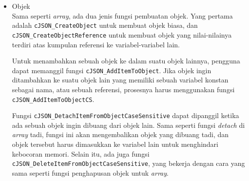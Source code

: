 \begin{itemize}[listparindent=\parindent]
	Jika ada sebuah objek yang ingin dihapus dari \textit{array} tertentu, perangkat lunak dapat memanggil fungsi \verb|cJSON_DetachItemFromArray|. Fungsi ini akan mengembalikan objek yang dihapus dari \textit{array} tadi, jadi objek ini harus diberikan ke sebuah penunjuk lainnya (dimasukkan ke dalam variabel lain) agar tidak terjadi kebocoran memori. Selain fungsi tersebut, fungsi \verb|cJSON_DeleteItemFromArray| juga dapat digunakan\textemdash bedanya adalah objek yang dihapus dari \textit{array} tadi, jika dihapus menggunakan fungsi ini, akan langsung dihapus, seakan-akan fungsi \verb|cJSON_Delete| dipanggil untuk objek tersebut.
	
	Untuk menimpa/mengganti nilai suatu objek di dalam \textit{array}, fungsi \verb|cJSON_ReplaceItemIn|\linebreak \verb|Array| dapat dipanggil dengan indeks dari objek yang ingin diganti sebagai parameternya. Selain fungsi tersebut, fungsi \verb|cJSON_ReplaceItemViaPointer| juga dapat digunakan\textemdash fungsi ini bekerja dengan memutuskan (\textit{detach}) objek lama yang ingin diganti, menghapus objek tersebut, dan menyisipkan objek yang baru ke tempat objek lama yang sudah dihapus tadi.
	
	Terakhir, untuk mendapatkan objek tertentu dalam \textit{array} berdasarkan indeksnya, \mbox{perangkat} lunak dapat memanggil fungsi \verb|cJSON_GetArrayItem|. Ukuran dari \textit{array}-nya sendiri juga dapat dilihat dengan fungsi \verb|cJSON_GetArraySize|.
	
	\item Objek\\	
	Sama seperti \textit{array}, ada dua jenis fungsi pembuatan objek. Yang pertama adalah \verb|cJSON_Create|\linebreak \verb|Object| untuk membuat objek biasa, dan \verb|cJSON_CreateObjectReference| untuk membuat objek yang nilai-nilainya terdiri atas kumpulan referensi ke variabel-variabel lain.
	
	Untuk menambahkan sebuah objek ke dalam suatu objek lainnya, pengguna dapat \mbox{memanggil} fungsi \verb|cJSON_AddItemToObject|. Jika objek ingin ditambahkan ke suatu \mbox{objek} lain yang memiliki sebuah variabel konstan sebagai nama, atau sebuah referensi, prosesnya harus menggunakan fungsi \verb|cJSON_AddItemToObjectCS|.

	Fungsi \verb|cJSON_DetachItemFromObjectCaseSensitive| dapat dipanggil ketika ada \mbox{sebuah} objek ingin dibuang dari objek lain. Sama seperti fungsi \textit{detach} di \textit{array} tadi, fungsi ini akan mengembalikan objek yang dibuang tadi, dan objek tersebut harus \mbox{dimasukkan} ke variabel lain untuk menghindari kebocoran memori. Selain itu, ada juga fungsi \verb|cJSON_DeleteItemFrom|\linebreak \verb|ObjectCaseSensitive|, yang bekerja dengan cara yang sama seperti fungsi penghapusan objek untuk \textit{array}.


\end{itemize}
